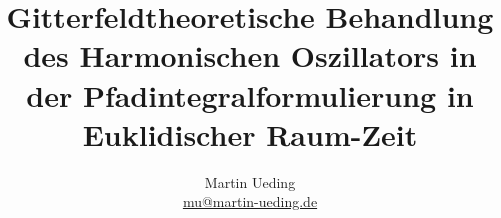 

\usepackage{csquotes}


\subject{Bachelorarbeit}
\title{%
    Gitterfeldtheoretische Behandlung des Harmonischen Oszillators in der
    Pfadintegralformulierung in Euklidischer Raum-Zeit
}
\author{
    Martin Ueding \\ \small{\href{mailto:mu@martin-ueding.de}{mu@martin-ueding.de}}
}
\publishers{Prof. Dr. Carsten Urbach}



\maketitle



\nocite{Thijssen/Computational_Physics}
\nocite{Creutz/Statistical_Approach_QM}

\nocite{Blossier/Eigenvalue}
\nocite{Busch/Two_Cold}

\nocite{Young/Jackknife}
\nocite{Oser/Bootstrap}

\nocite{Stroustrup/C++4}

\IfFileExists{\bibliographyfile}{
    \printbibliography
}{}



